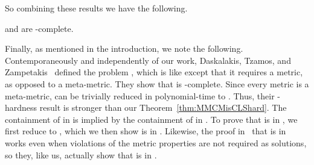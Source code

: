 So combining these results we have the following.

\begin{theorem}
\MMCM and \GCM are \CLS-complete.
\end{theorem}

Finally, as mentioned in the introduction, we note the following.
Contemporaneously and independently of our work, Daskalakis, Tzamos, and
Zampetakis~\cite{DTZ17} defined the problem \MBanach, which is like \MMCM except
that it requires a metric, as opposed to a meta-metric.  They show that \MBanach
is \CLS-complete.  Since every metric is a meta-metric, \MBanach can be
trivially reduced in polynomial-time to \MMCM. Thus, their \CLS-hardness result
is stronger than our Theorem~\ref{thm:MMCMisCLShard}.
The
containment of \MBanach in \CLS is implied by the containment of \MMCM in \CLS. 
To prove
that \MMCM is in \CLS, we first reduce to \GCM, which we then show is in \CLS.
Likewise, the proof in~\cite{DTZ17} that \MBanach is in \CLS works even when
violations of the metric properties are not required as solutions, so they, like
us, actually show that \GCM is in \CLS.
